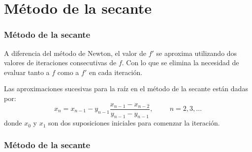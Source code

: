 \section{M\'{e}todo de la secante}
\begin{frame}
\frametitle{M\'{e}todo de la secante}
A diferencia del m\'{e}todo de Newton, el valor de $f'$ se aproxima utilizando dos valores de iteraciones consecutivas de $f$. Con lo que se elimina la necesidad de evaluar tanto a $f$ como a $f'$ en cada iteraci\'{o}n.
\end{frame}
\begin{frame}
Las aproximaciones sucesivas para la ra\'{i}z en el m\'{e}todo de la secante est\'{a}n dadas por:
\[ x_{n} = x_{n-1} - y_{n-1} \dfrac{x_{n-1} - x_{n-2}}{y_{n-1}- y_{n-1}}, \hspace{1cm} n=2,3,\ldots \]
donde $x_{0}$ y $x_{1}$ son dos suposiciones iniciales para comenzar la iteraci\'{o}n.
\end{frame}
\begin{frame}[fragile]
\frametitle{M\'{e}todo de la secante}
\begin{center}
\end{center}
\end{frame}

